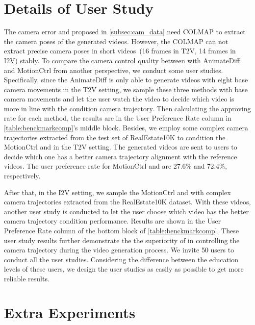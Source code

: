\section{Details of User Study}
\label{suppsec:user_study}
The camera error \te and \rote proposed in \cref{subsec:cam_data} need COLMAP to extract the camera poses of the generated videos.
%
However, the COLMAP can not extract precise camera poses in short videos~(16 frames in T2V, 14 frames in I2V) stably.
%
To compare the camera control quality between \method with AnimateDiff and MotionCtrl from another perspective, we conduct some user studies.
%
Specifically, since the AnimateDiff is only able to generate videos with eight base camera movements in the T2V setting, we sample these three methods with base camera movements and let the user watch the video to decide which video is more in line with the condition camera trajectory. 
%
Then calculating the approving rate for each method, the results are in the User Preference Rate column in \cref{table:benckmarkcomp}'s middle block.
%
Besides, we employ some complex camera trajectories extracted from the test set of RealEstate10K to condition the MotionCtrl and \method in the T2V setting.
%
The generated videos are sent to users to decide which one has a better camera trajectory alignment with the reference videos.
%
The user preference rate for MotionCtrl and \method are 27.6\% and 72.4\%, respectively.

After that, in the I2V setting, we sample the MotionCtrl and \method with complex camera trajectories extracted from the RealEstate10K dataset. 
%
With these videos, another user study is conducted to let the user choose which video has the better camera trajectory condition performance.
% 
Results are shown in the User Preference Rate column of the bottom block of \cref{table:benckmarkcomp}.
%
These user study results further demonstrate the the superiority of \method in controlling the camera trajectory during the video generation process.
%
We invite 50 users to conduct all the user studies.
%
Considering the difference between the education levels of these users, we design the user studies as easily as possible to get more reliable results. 

\section{Extra Experiments}
\label{suppsec:more_exps}
